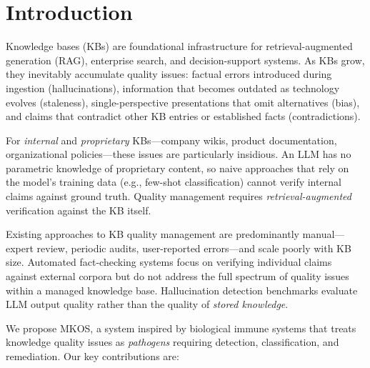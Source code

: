 \documentclass[11pt]{article}
\begin{document}
\section{Introduction}
\label{sec:intro}

Knowledge bases (KBs) are foundational infrastructure for retrieval-augmented generation (RAG), enterprise search, and decision-support systems. As KBs grow, they inevitably accumulate quality issues: factual errors introduced during ingestion (hallucinations), information that becomes outdated as technology evolves (staleness), single-perspective presentations that omit alternatives (bias), and claims that contradict other KB entries or established facts (contradictions).

For \emph{internal} and \emph{proprietary} KBs---company wikis, product documentation, organizational policies---these issues are particularly insidious. An LLM has no parametric knowledge of proprietary content, so naive approaches that rely on the model's training data (e.g., few-shot classification) cannot verify internal claims against ground truth. Quality management requires \emph{retrieval-augmented} verification against the KB itself.

Existing approaches to KB quality management are predominantly manual---expert review, periodic audits, user-reported errors---and scale poorly with KB size. Automated fact-checking systems \citep{thorne2018fever, guo2022survey} focus on verifying individual claims against external corpora but do not address the full spectrum of quality issues within a managed knowledge base. Hallucination detection benchmarks \citep{li2023halueval, lin2022truthfulqa} evaluate LLM output quality rather than the quality of \emph{stored knowledge}.

We propose MKOS, a system inspired by biological immune systems that treats knowledge quality issues as \emph{pathogens} requiring detection, classification, and remediation. Our key contributions are:
\end{document}
